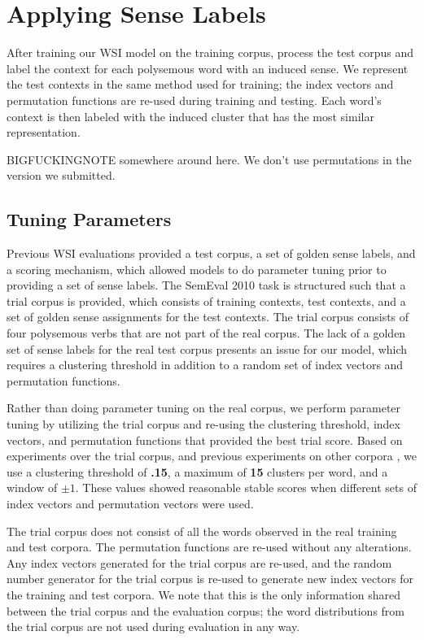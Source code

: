 \documentclass[11pt]{article}
\begin{document}
\section{Applying Sense Labels}

After training our WSI model on the training corpus, process the test corpus and
label the context for each polysemous word with an induced sense.  We represent
the test contexts in the same method used for training; the index vectors and
permutation functions are re-used during training and testing.  Each word's
context is then labeled with the induced cluster that has the most similar
representation.  

BIGFUCKINGNOTE somewhere around here.  We don't use permutations in the version
we submitted. 

\subsection{Tuning Parameters}

Previous WSI evaluations provided a test corpus, a set of golden sense labels,
and a scoring mechanism, which allowed models to do parameter tuning prior to
providing a set of sense labels.  The SemEval 2010 task is structured such that
a trial corpus is provided, which consists of training contexts, test contexts,
and a set of golden sense assignments for the test contexts.  The trial corpus
consists of four polysemous verbs that are not part of the real corpus.  The
lack of a golden set of sense labels for the real test corpus presents an issue
for our model, which requires a clustering threshold in addition to a random set
of index vectors and permutation functions.

Rather than doing parameter tuning on the real corpus, we perform parameter
tuning by utilizing the trial corpus and re-using the clustering threshold,
index vectors, and permutation functions that provided the best trial score.
Based on experiments over the trial corpus, and previous experiments on other
corpora \cite{}, we use a clustering threshold of {\bf .15}, a maximum
of {\bf 15} clusters per word, and a window of $\pm1$.  These values showed
reasonable stable scores when different sets of index vectors and permutation
vectors were used.

The trial corpus does not consist of all the words observed in the real training
and test corpora.  The permutation functions are re-used without any
alterations.  Any index vectors generated for the trial corpus are re-used, and
the random number generator for the trial corpus is re-used to generate new
index vectors for the training and test corpora.  We note that this is the only
information shared between the trial corpus and the evaluation corpus; the word
distributions from the trial corpus are not used during evaluation in any way.
\end{document}
